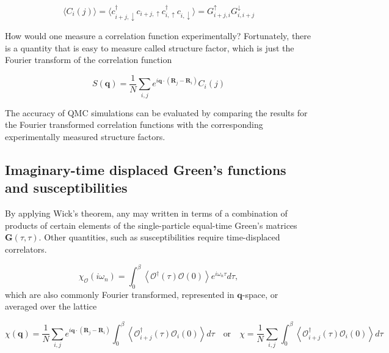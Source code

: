 \begin{equation}
\big\langle C_i(j) \big\rangle = \big\langle c_{i+j, \downarrow}^\dagger c_{i+j, \uparrow} c_{i, \uparrow}^\dagger c_{i, \downarrow} \big\rangle = G_{i+j, i}^\uparrow G_{i, i + j}^\downarrow
\end{equation}

How would one measure a correlation function experimentally? Fortunately, there is a quantity that is easy to measure called structure factor, which is just the Fourier transform of the correlation function

\begin{equation}
S(\bm q) = \frac{1}{N} \sum_{i, j} e^{i\bm q \cdot (\bm R_j - \bm R_i) } C_i(j) 
\end{equation}

The accuracy of QMC simulations can be evaluated by comparing the results for the Fourier transformed correlation functions with the corresponding experimentally measured structure factors.

\subsection{Imaginary-time displaced Green's functions and susceptibilities}
\label{subsec:imtimedisp}

By applying Wick's theorem, any  may written in terms of a combination of products of certain elements of the single-particle equal-time Green's matrices $\bm G ( \tau, \tau )$.
Other  quantities, such as susceptibilities require time-displaced correlators.

\begin{equation}
\chi_{\mathcal{O}} ( i \omega_n ) = \int_0^\beta \left\langle \mathcal{O}^\dagger ( \tau ) \mathcal{O} ( 0 ) \right\rangle e^{i\omega_n \tau} d\tau ,
\end{equation}
which are also commonly Fourier transformed, represented in $\bm q$-space, or averaged over the lattice

\begin{equation}
\chi ( \bm q ) = \frac{1}{N} \sum_{i, j} e^{i\bm q \cdot ( \bm R_j - \bm R_i )} \int_0^\beta \left\langle \mathcal{O}_{i + j}^\dagger ( \tau ) \mathcal{O}_i ( 0 ) \right\rangle d\tau \quad \text{or} \quad \chi = \frac{1}{N} \sum_{i, j} \int_0^\beta \left\langle \mathcal{O}_{i + j}^\dagger ( \tau ) \mathcal{O}_i ( 0 ) \right\rangle d\tau
\end{equation}

